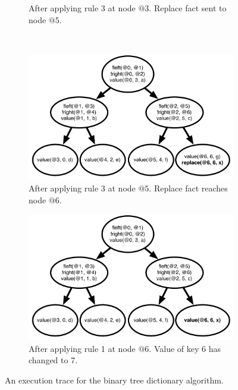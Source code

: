 \begin{figure}[ht]
\begin{subfigure}[b]{0.45\textwidth}
                \caption{After applying rule 3 at node $@3$. Replace fact sent to node $@5$.}
                \label{fig:btree_trace2}
        \end{subfigure}\\
        \begin{subfigure}[b]{0.45\textwidth}
                \includegraphics[width=\textwidth]{btree_trace3}
                \caption{After applying rule 3 at node $@5$. Replace fact reaches node $@6$.}
                \label{fig:btree_trace3}
        \end{subfigure}%
        \begin{subfigure}[b]{0.45\textwidth}
                  \includegraphics[width=\textwidth]{btree_trace4}
                  \caption{After applying rule 1 at node $@6$. Value of key 6 has changed to 7.}
                  \label{fig:btree_trace4}
          \end{subfigure}
        \caption{An execution trace for the binary tree dictionary algorithm.}\label{fig:btree_trace}
\end{figure}

